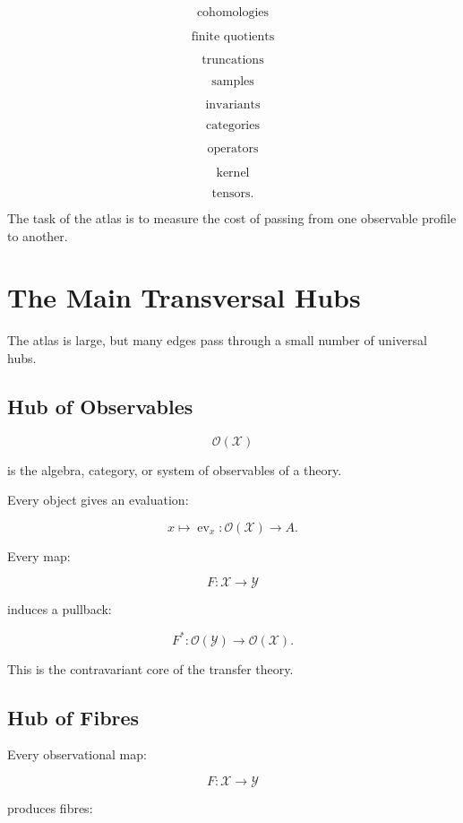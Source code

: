 \documentclass[11pt]{article}
\begin{document}
\[
\text{cohomologies}
\]

\[
\text{finite quotients}
\]

\[
\text{truncations}
\]

\[
\text{samples}
\]

\[
\text{invariants}
\]

\[
\text{categories}
\]

\[
\text{operators}
\]

\[
\text{kernel}
\]

\[
\text{tensors}.
\]

The task of the atlas is to measure the cost of passing from one observable profile to another.



\section{The Main Transversal Hubs}

The atlas is large, but many edges pass through a small number of universal hubs.



\subsection{Hub of Observables}

\[
\mathcal O(\mathcal X)
\]

is the algebra, category, or system of observables of a theory.

Every object gives an evaluation:

\[
x\mapsto \operatorname{ev}_x:\mathcal O(\mathcal X)\to A.
\]

Every map:

\[
F:\mathcal X\to\mathcal Y
\]

induces a pullback:

\[
F^\ast:\mathcal O(\mathcal Y)\to\mathcal O(\mathcal X).
\]

This is the contravariant core of the transfer theory.



\subsection{Hub of Fibres}

Every observational map:

\[
F:\mathcal X\to\mathcal Y
\]

produces fibres:
\end{document}
